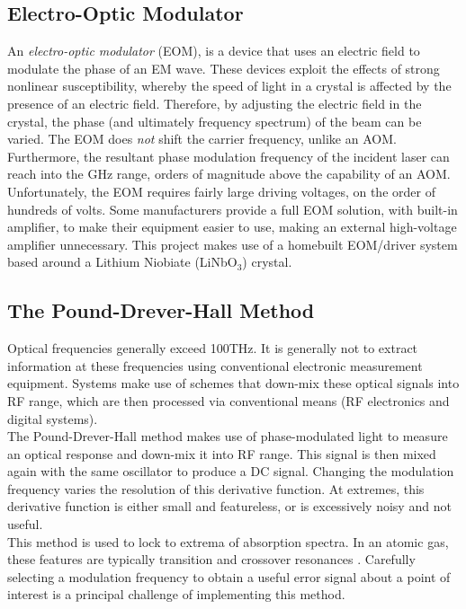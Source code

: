 \subsection{Electro-Optic Modulator}

An \emph{electro-optic modulator} (EOM), is a device that uses an electric field to modulate the phase of an EM wave.  These devices exploit the effects of strong nonlinear susceptibility, whereby the speed of light in a crystal is affected by the presence of an electric field.  Therefore, by adjusting the electric field in the crystal, the phase (and ultimately frequency spectrum) of the beam can be varied. The EOM does \emph{not} shift the carrier frequency, unlike an AOM. Furthermore, the resultant phase modulation frequency of the incident laser can reach into the GHz range, orders of magnitude above the
capability of an AOM.\\

Unfortunately, the EOM requires fairly large driving voltages, on the order of hundreds of volts.  Some manufacturers provide a full EOM solution, with built-in amplifier, to make their equipment easier to use, making an external high-voltage amplifier unnecessary. This project makes use of a homebuilt EOM/driver system based around a Lithium Niobiate (LiNbO$_3$) crystal.

\subsection{The Pound-Drever-Hall Method}

Optical frequencies generally exceed 100THz. It is generally not to extract information at these frequencies using conventional electronic measurement equipment. Systems make use of schemes that down-mix these optical signals into RF range, which are then processed via conventional means (RF electronics and digital systems). \\

The Pound-Drever-Hall method makes use of phase-modulated light to measure an optical response and down-mix it into RF range.  This signal is then mixed again with the same oscillator to produce a DC signal. Changing the modulation frequency varies the resolution of this derivative function. At extremes, this derivative function is either small and featureless, or is excessively noisy and not useful. \\

This method is used to lock to extrema of absorption spectra.  In an atomic gas, these features are typically transition and crossover resonances \cite{maguire2006}. Carefully selecting a modulation frequency to obtain a useful error signal about a point of interest is a principal challenge of implementing this method.

